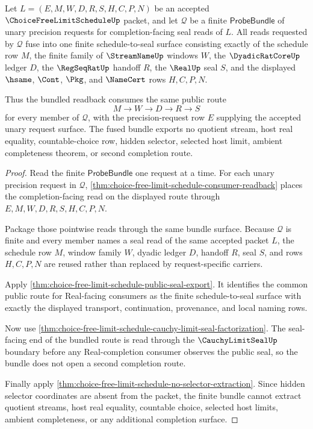 \begin{theorem}
\label{thm:choice-free-limit-schedule-probebundle-fusion}
Let $L=(E,M,W,D,R,S,H,C,P,N)$ be an accepted $\ChoiceFreeLimitScheduleUp$ packet, and let $\mathcal{Q}$ be a finite $\mathsf{ProbeBundle}$ of unary precision requests for completion-facing seal reads of $L$. All reads requested by $\mathcal{Q}$ fuse into one finite schedule-to-seal surface consisting exactly of the schedule row $M$, the finite family of $\StreamNameUp$ windows $W$, the $\DyadicRatCoreUp$ ledger $D$, the $\RegSeqRatUp$ handoff $R$, the $\RealUp$ seal $S$, and the displayed $\hsame$, $\Cont$, $\Pkg$, and $\NameCert$ rows $H,C,P,N$.

Thus the bundled readback consumes the same public route
$$
M \to W \to D \to R \to S
$$
for every member of $\mathcal{Q}$, with the precision-request row $E$ supplying the accepted unary request surface. The fused bundle exports no quotient stream, host real equality, countable-choice row, hidden selector, selected host limit, ambient completeness theorem, or second completion route.
\end{theorem}
\begin{proof}
Read the finite $\mathsf{ProbeBundle}$ one request at a time. For each unary precision request in $\mathcal{Q}$, \autoref{thm:choice-free-limit-schedule-consumer-readback} places the completion-facing read on the displayed route through $E,M,W,D,R,S,H,C,P,N$.

Package those pointwise reads through the same bundle surface. Because $\mathcal{Q}$ is finite and every member names a seal read of the same accepted packet $L$, the schedule row $M$, window family $W$, dyadic ledger $D$, handoff $R$, seal $S$, and rows $H,C,P,N$ are reused rather than replaced by request-specific carriers.

Apply \autoref{thm:choice-free-limit-schedule-public-seal-export}. It identifies the common public route for Real-facing consumers as the finite schedule-to-seal surface with exactly the displayed transport, continuation, provenance, and local naming rows.

Now use \autoref{thm:choice-free-limit-schedule-cauchy-limit-seal-factorization}. The seal-facing end of the bundled route is read through the $\CauchyLimitSealUp$ boundary before any Real-completion consumer observes the public seal, so the bundle does not open a second completion route.

Finally apply \autoref{thm:choice-free-limit-schedule-no-selector-extraction}. Since hidden selector coordinates are absent from the packet, the finite bundle cannot extract quotient streams, host real equality, countable choice, selected host limits, ambient completeness, or any additional completion surface.
\end{proof}

